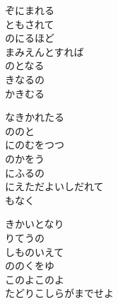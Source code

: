 \documentclass[10pt,b5j]{tarticle} %
\begin{document}
\vspace{1.5em} %
\newcommand{\linespace}{0.5em} %
\newcommand{\blocksize}{0.5\hsize} %
\begin{enumerate} %
    \begin{minipage}[c]{\blocksize}
    
        \vspace{\linespace}
        \item
        ぞにまれる\\
        ともされて\\
        のにるほど\\
        まみえんとすれば\\
        のとなる\\
        きなるの\\
        かきむる
        
        \vspace{\linespace}
        \item
        なきかれたる\\
        ののと\\
        にのむをつつ\\
        のかをう\\
        にふるの\\
        にえただよいしだれて\\
        もなく
        
        \vspace{\linespace}
        \item
        きかいとなり\\
        りてうの\\
        しものいえて\\
        ののくをゆ\\
        このよこのよ\\
        たどりこしらがまでせよ
        

\end{minipage}
\end{enumerate}
\end{document}

